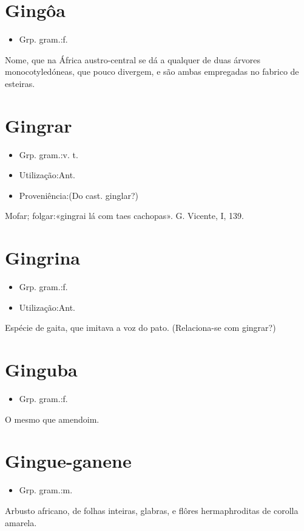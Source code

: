 \section{Gingôa}
\begin{itemize}
\item {Grp. gram.:f.}
\end{itemize}
Nome, que na África austro-central se dá a qualquer de duas árvores monocotyledóneas, que pouco divergem, e são ambas empregadas no fabrico de esteiras.
\section{Gingrar}
\begin{itemize}
\item {Grp. gram.:v. t.}
\end{itemize}
\begin{itemize}
\item {Utilização:Ant.}
\end{itemize}
\begin{itemize}
\item {Proveniência:(Do cast. \textunderscore ginglar\textunderscore ?)}
\end{itemize}
Mofar; folgar:«\textunderscore gingrai lá com taes cachopas\textunderscore ». G. Vicente, I, 139.
\section{Gingrina}
\begin{itemize}
\item {Grp. gram.:f.}
\end{itemize}
\begin{itemize}
\item {Utilização:Ant.}
\end{itemize}
Espécie de gaita, que imitava a voz do pato.
(Relaciona-se com \textunderscore gingrar\textunderscore ?)
\section{Ginguba}
\begin{itemize}
\item {Grp. gram.:f.}
\end{itemize}
O mesmo que \textunderscore amendoim\textunderscore .
\section{Gingue-ganene}
\begin{itemize}
\item {Grp. gram.:m.}
\end{itemize}
Arbusto africano, de folhas inteiras, glabras, e flôres hermaphroditas de corolla amarela.
